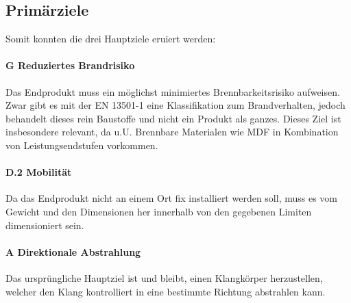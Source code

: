 \subsection{Primärziele}Somit konnten die drei Hauptziele eruiert werden:
\paragraph{G Reduziertes Brandrisiko} Das Endprodukt muss ein möglichst minimiertes Brennbarkeitsrisiko aufweisen. Zwar gibt es mit der EN 13501-1 eine Klassifikation zum Brandverhalten, jedoch behandelt dieses rein Baustoffe und nicht ein Produkt als ganzes. Dieses Ziel ist insbesondere relevant, da u.U. Brennbare Materialen wie MDF in Kombination von Leistungsendstufen vorkommen.
\paragraph{D.2 Mobilität} Da das Endprodukt nicht an einem Ort fix installiert werden soll, muss es vom Gewicht und den Dimensionen her innerhalb von den gegebenen Limiten dimensioniert sein.
\paragraph{A Direktionale Abstrahlung} Das ursprüngliche Hauptziel ist und bleibt, einen Klangkörper herzustellen, welcher den Klang kontrolliert in eine bestimmte Richtung abstrahlen kann.